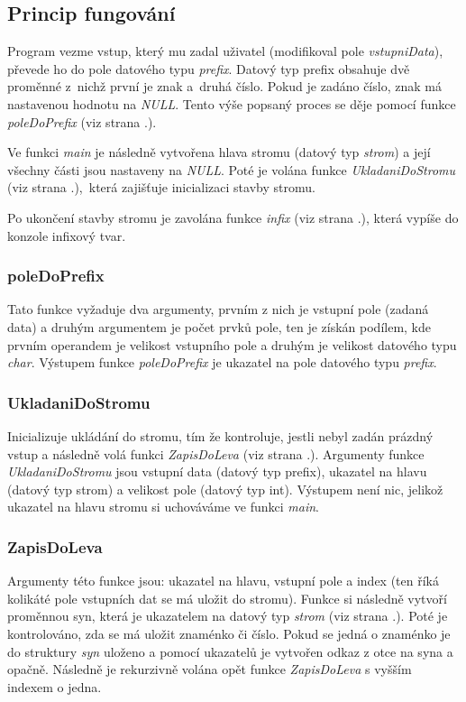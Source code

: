 \documentclass[12pt,a4paper]{report}
\begin{document}
\subsection{Princip fungování}
Program vezme vstup, který mu zadal uživatel (modifikoval pole \textit{vstupniData}), převede ho do pole datového typu \textit{prefix}. Datový typ prefix obsahuje dvě proměnné z~nichž první je znak a~druhá číslo. Pokud je zadáno číslo, znak má nastavenou hodnotu na \textit{NULL}. Tento výše popsaný proces se děje pomocí funkce \textit{poleDoPrefix} (viz strana \pageref{pDP}.).

Ve funkci \textit{main} je následně vytvořena hlava stromu (datový typ \textit{strom}) a její všechny části jsou nastaveny na \textit{NULL}. Poté je volána funkce \textit{UkladaniDoStromu} (viz strana \pageref{UDS}.),~která zajišťuje inicializaci stavby stromu.

Po ukončení stavby stromu je zavolána funkce \textit{infix} (viz strana \pageref{infix}.), která vypíše do konzole infixový tvar. 


\subsubsection{poleDoPrefix} \label{pDP}
Tato funkce vyžaduje dva argumenty, prvním z nich je vstupní pole (zadaná data) a druhým argumentem je počet prvků pole, ten je získán podílem, kde prvním operandem je velikost vstupního pole a druhým je velikost datového typu \textit{char}. Výstupem funkce \textit{poleDoPrefix} je ukazatel na  pole datového typu \textit{prefix}.

\subsubsection{UkladaniDoStromu} \label{UDS}
Inicializuje ukládání do stromu, tím že kontroluje, jestli nebyl zadán prázdný vstup a následně volá funkci \textit{ZapisDoLeva} (viz strana \pageref{ZDL}.). Argumenty funkce \textit{UkladaniDoStromu} jsou vstupní data (datový typ prefix), ukazatel na hlavu (datový typ strom) a velikost pole (datový typ int). Výstupem není nic, jelikož ukazatel na hlavu stromu si uchováváme ve funkci \textit{main}.

\subsubsection{ZapisDoLeva} \label{ZDL}
Argumenty této funkce jsou: ukazatel na hlavu, vstupní pole a index (ten říká kolikáté pole vstupních dat se má uložit do stromu). Funkce si následně vytvoří proměnnou syn, která je ukazatelem na datový typ \textit{strom} (viz strana \pageref{strom}.). Poté je kontrolováno, zda se má uložit znaménko či číslo. Pokud se jedná o znaménko je do struktury \textit{syn} uloženo a pomocí ukazatelů je vytvořen odkaz z otce na syna a opačně. Následně je rekurzivně volána opět funkce \textit{ZapisDoLeva} s vyšším indexem o jedna. 
\end{document}
